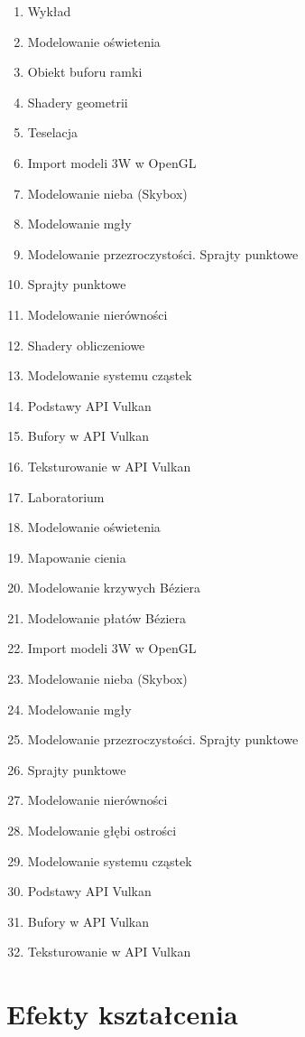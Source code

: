 \documentclass[12pt, a4paper]{article}
\begin{document}
\begin{enumerate}
  \item Wykład
  \item Modelowanie oświetenia
  \item Obiekt buforu ramki
  \item Shadery geometrii
  \item Teselacja
  \item Import modeli 3W w OpenGL
  \item Modelowanie nieba (Skybox)
  \item Modelowanie mgły
  \item Modelowanie przezroczystości. Sprajty punktowe
  \item Sprajty punktowe
  \item Modelowanie nierówności
  \item Shadery obliczeniowe
  \item Modelowanie systemu cząstek
  \item Podstawy API Vulkan
  \item Bufory w API Vulkan
  \item Teksturowanie w API Vulkan
  \item Laboratorium
  \item Modelowanie oświetenia
  \item Mapowanie cienia
  \item Modelowanie krzywych Béziera
  \item Modelowanie płatów Béziera
  \item Import modeli 3W w OpenGL
  \item Modelowanie nieba (Skybox)
  \item Modelowanie mgły
  \item Modelowanie przezroczystości. Sprajty punktowe
  \item Sprajty punktowe
  \item Modelowanie nierówności
  \item Modelowanie głębi ostrości
  \item Modelowanie systemu cząstek
  \item Podstawy API Vulkan
  \item Bufory w API Vulkan
  \item Teksturowanie w API Vulkan
\end{enumerate}

\section{Efekty kształcenia}
\end{document}
